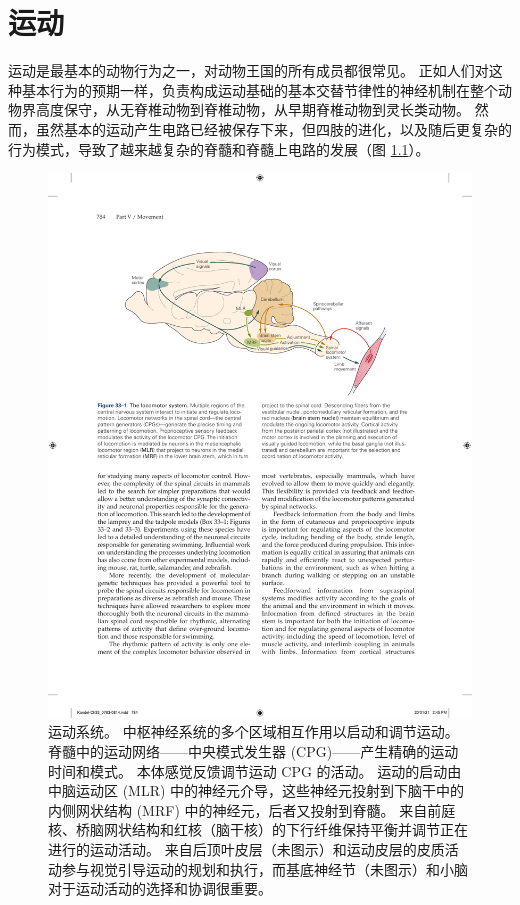 \chapter{运动} \label{chap:chap33}

运动是最基本的动物行为之一，对动物王国的所有成员都很常见。 正如人们对这种基本行为的预期一样，负责构成运动基础的基本交替节律性的神经机制在整个动物界高度保守，从无脊椎动物到脊椎动物，从早期脊椎动物到灵长类动物。 
然而，虽然基本的运动产生电路已经被保存下来，但四肢的进化，以及随后更复杂的行为模式，导致了越来越复杂的脊髓和脊髓上电路的发展（图 \ref{fig:33_1}）。

\begin{figure}[htbp]
	\centering
	\includegraphics[width=0.85\linewidth]{chap33/fig_33_1}
	\caption{运动系统。 中枢神经系统的多个区域相互作用以启动和调节运动。 脊髓中的运动网络——中央模式发生器 (CPG)——产生精确的运动时间和模式。 本体感觉反馈调节运动 CPG 的活动。 运动的启动由中脑运动区 (MLR) 中的神经元介导，这些神经元投射到下脑干中的内侧网状结构 (MRF) 中的神经元，后者又投射到脊髓。 来自前庭核、桥脑网状结构和红核（脑干核）的下行纤维保持平衡并调节正在进行的运动活动。 来自后顶叶皮层（未图示）和运动皮层的皮质活动参与视觉引导运动的规划和执行，而基底神经节（未图示）和小脑对于运动活动的选择和协调很重要。}
	\label{fig:33_1}
\end{figure}


